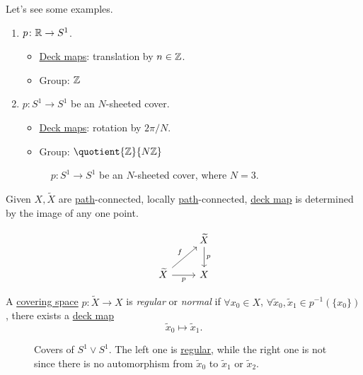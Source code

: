 \begin{eg}
	Let's see some examples.
	\begin{enumerate}
		\item \(p\colon \mathbb{\MakeUppercase{r}} \to S^1\).
		      \begin{itemize}
			      \item \hyperref[def:deck-transformation]{Deck maps}: translation by \(n\in \mathbb{\MakeUppercase{z}} \).
			      \item Group: \(\mathbb{\MakeUppercase{z}} \)
		      \end{itemize}
		\item \(p\colon S^{1}\to S^1\) be an \(N\)-sheeted cover.
		      \begin{itemize}
			      \item \hyperref[def:deck-transformation]{Deck maps}: rotation by \(2\pi / N\).
			      \item Group: \(\quotient{\mathbb{\MakeUppercase{z}} }{N \mathbb{\MakeUppercase{z}} } \)
		      \end{itemize}
		      \begin{figure}[H]
			      \centering
			      \caption{\(p\colon S^1 \to S^1\) be an \(N\)-sheeted cover, where \(N = 3\).}
			      \label{fig:eg:lec17:N-sheeted-cover}
		      \end{figure}
	\end{enumerate}
\end{eg}

\begin{exercise}
	Given \(X, \widetilde{X} \) are \hyperref[def:path]{path}-connected, locally \hyperref[def:path]{path}-connected,
	\hyperref[def:deck-transformation]{deck map} is determined by the image of any one point.
\end{exercise}
\begin{answer}
	\[\begin{tikzcd}
			& {\widetilde{X}} \\
			{\widetilde{X}} & X
			\arrow["f", from=2-1, to=1-2]
			\arrow["p"', from=2-1, to=2-2]
			\arrow["p", from=1-2, to=2-2]
		\end{tikzcd}\]
\end{answer}

\begin{definition}\label{def:regular}\label{def:normal}
	A \hyperref[def:covering-space]{covering space} \(p\colon \widetilde{X} \to X\) is \emph{regular} or \emph{normal}
	if \(\forall x_0\in X\), \(\forall \widetilde{x}_0, \widetilde{x} _1 \in p^{-1} (\{x_0\})\), there exists
	a \hyperref[def:deck-transformation]{deck map}
	\[
		\widetilde{x} _0 \mapsto \widetilde{x} _1.
	\]
\end{definition}
\begin{figure}[H]
	\centering
	\caption{Covers of \(S^1\vee S^1\). The left one is \hyperref[def:regular]{regular}, while the right one is not since there is no
		automorphism from \(\widetilde{x} _0\) to \(\widetilde{x} _1\) or \(\widetilde{x} _2\).}
	\label{fig:eg:lec17:regular}
\end{figure}

